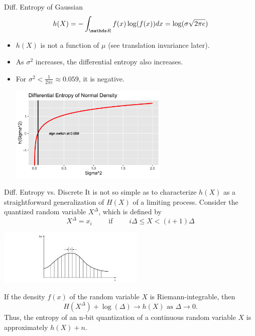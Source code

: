 \documentclass[11pt,compress,t,notes=noshow, xcolor=table]{beamer}
\begin{document}
\begin{vbframe}{Diff. Entropy of Gaussian}
$$h(X) = - \int_{\R} f(x) \log(f(x)) dx = \log(\sigma \sqrt{2\pi e})$$
\vspace{-0.2cm}
  \begin{itemize}
    \item $h(X)$ is not a function of $\mu$ (see translation invariance later).
    \item As $\sigma^2$ increases, the differential entropy also increases.
    \item For $\sigma^2 < \frac{1}{2\pi e}\approx 0.059$, it is negative.
    \vspace{0.1cm}
    \begin{center}
    \includegraphics[width = 0.6\textwidth]{figure/normal_entropy_sigma.png}
    \end{center}
  \end{itemize}
\end{vbframe}


\begin{vbframe}{Diff. Entropy vs. Discrete}
It is not so simple as to characterize $h(X)$ as 
a straightforward generalization of $H(X)$ of a limiting process.
Consider the quantized random variable $X^\Delta$, which is defined by
$$X^\Delta = x_i \qquad \text{ if } \qquad i \Delta \leq X < (i + 1) \Delta$$  
\begin{center}
\includegraphics[width = 7cm ]{figure_man/diffent-quant.png} \\
\end{center}

If the density $f(x)$ of the random variable $X$ is Riemann-integrable, then
$$H(X^\Delta) + \log(\Delta) \rightarrow h(X) \text{ as } \Delta \rightarrow 0.$$
Thus, the entropy of an n-bit quantization of a continuous random variable 
$X$ is approximately $h(X) + n$.
\end{vbframe}
\end{document}
